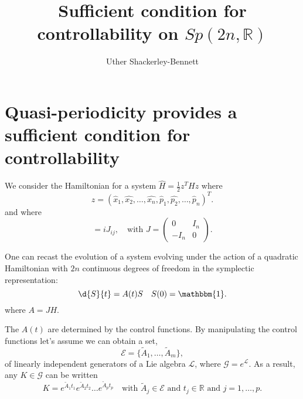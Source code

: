 
\DeclareMathOperator{\Real}{Re}
\usepackage{tikz}
\usetikzlibrary{fit,matrix}


\title{Sufficient condition for controllability on $Sp(2n,\mathbb{R})$}
\author{Uther Shackerley-Bennett}
\maketitle


\tableofcontents

\section{Quasi-periodicity provides a sufficient condition for controllability}
We consider the Hamiltonian for a system $\hat{H} = \frac{1}{2}z^T H z$ where
\begin{equation} z = (\hat{x}_1, \hat{x_2}, \ldots, \hat{x_n}, \hat{p}_1, \hat{p_2}, \ldots, \hat{p}_n)^T. \end{equation}
and where
\begin{equation} [z	,z^T] = iJ_{ij}, \quad \text{with } J = \begin{pmatrix} 0 & I_n \\ -I_n & 0 \end{pmatrix}. \end{equation}

One can recast the evolution of a system evolving under the action of a quadratic Hamiltonian with $2n$ continuous degrees of freedom in the symplectic representation:
\begin{equation} \d{S}{t} = A(t)S \quad S(0) = \mathbbm{1}. \label{eq:dyneqn} \end{equation}
where $A = JH$.

The $A(t)$ are determined by the control functions. By manipulating the control functions let's assume we can obtain a set,
\begin{equation}
\mathcal{E} = \{ \tilde{A}_1, \ldots, \tilde{A}_m\},
\end{equation}
of linearly independent generators of a Lie algebra $\mathcal{L}$, where $\mathcal{G} = e^{\mathcal{L}}$. As a result, any $K \in \mathcal{G}$ can be written
\begin{equation}
K = e^{\tilde{A}_1t_1}e^{\tilde{A}_2t_2}\ldots e^{\tilde{A}_pt_p} \quad \text{with } \tilde{A}_j \in \mathcal{E} \text{ and } t_j  \in \mathbb{R} \text{ and } j = 1,\ldots,p. \label{eq:groupelement}
\end{equation}


